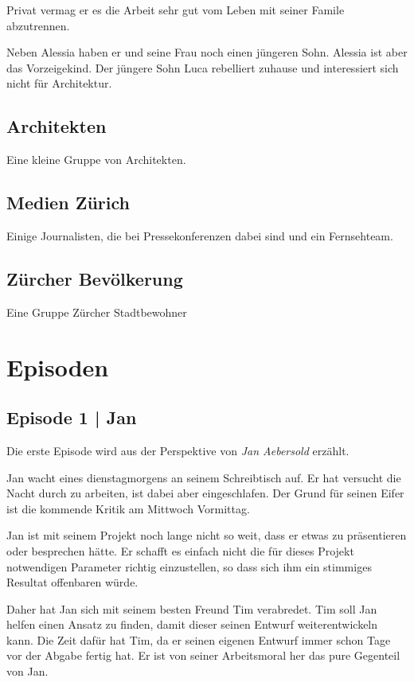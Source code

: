 \documentclass[11pt,a4paper,ngerman]{scrreprt}
\begin{document}
Privat vermag er es die Arbeit sehr gut vom Leben mit seiner Famile abzutrennen.

Neben Alessia haben er und seine Frau noch einen jüngeren Sohn. Alessia ist aber
das Vorzeigekind. Der jüngere Sohn Luca rebelliert zuhause und interessiert sich
nicht für Architektur.

\section*{Architekten}

Eine kleine Gruppe von Architekten.

\section*{Medien Zürich}

Einige Journalisten, die bei Pressekonferenzen dabei sind und ein Fernsehteam.

\section*{Zürcher Bevölkerung}

Eine Gruppe Zürcher Stadtbewohner

\chapter*{Episoden}

\section*{Episode 1 | Jan}

Die erste Episode wird aus der Perspektive von \emph{Jan Aebersold} erzählt.

Jan wacht eines dienstagmorgens an seinem Schreibtisch auf. Er hat versucht die
Nacht durch zu arbeiten, ist dabei aber eingeschlafen. Der Grund für seinen
Eifer ist die kommende Kritik am Mittwoch Vormittag.

Jan ist mit seinem Projekt noch lange nicht so weit, dass er etwas zu
präsentieren oder besprechen hätte. Er schafft es einfach nicht die für dieses
Projekt notwendigen Parameter richtig einzustellen, so dass sich ihm ein
stimmiges Resultat offenbaren würde.

Daher hat Jan sich mit seinem besten Freund Tim verabredet. Tim soll Jan helfen
einen Ansatz zu finden, damit dieser seinen Entwurf weiterentwickeln kann. Die
Zeit dafür hat Tim, da er seinen eigenen Entwurf immer schon Tage vor der Abgabe
fertig hat. Er ist von seiner Arbeitsmoral her das pure Gegenteil von Jan.
\end{document}
